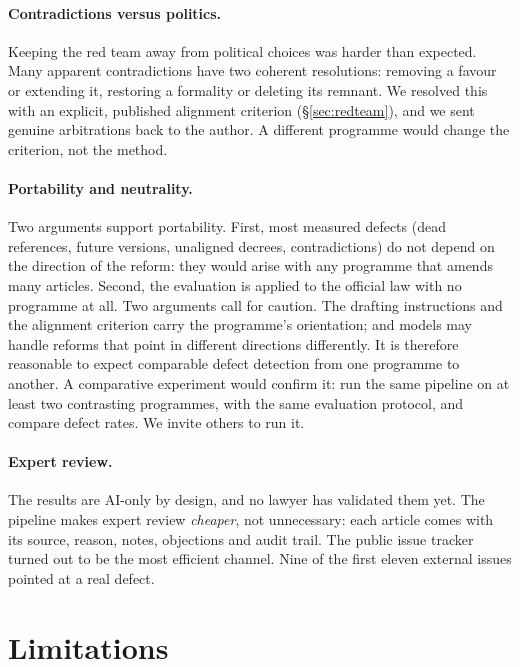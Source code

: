 \documentclass[11pt,a4paper]{article}
\begin{document}
\paragraph{Contradictions versus politics.}
Keeping the red team away from political choices was harder than expected. Many apparent contradictions have two coherent resolutions: removing a favour or extending it, restoring a formality or deleting its remnant. We resolved this with an explicit, published alignment criterion (\S\ref{sec:redteam}), and we sent genuine arbitrations back to the author. A different programme would change the criterion, not the method.

\paragraph{Portability and neutrality.}
Two arguments support portability. First, most measured defects (dead references, future versions, unaligned decrees, contradictions) do not depend on the direction of the reform: they would arise with any programme that amends many articles. Second, the evaluation is applied to the official law with no programme at all. Two arguments call for caution. The drafting instructions and the alignment criterion carry the programme's orientation; and models may handle reforms that point in different directions differently. It is therefore reasonable to expect comparable defect detection from one programme to another. A comparative experiment would confirm it: run the same pipeline on at least two contrasting programmes, with the same evaluation protocol, and compare defect rates. We invite others to run it.

\paragraph{Expert review.}
The results are AI-only by design, and no lawyer has validated them yet. The pipeline makes expert review \emph{cheaper}, not unnecessary: each article comes with its source, reason, notes, objections and audit trail. The public issue tracker turned out to be the most efficient channel. Nine of the first eleven external issues pointed at a real defect.

\section{Limitations}
\end{document}
